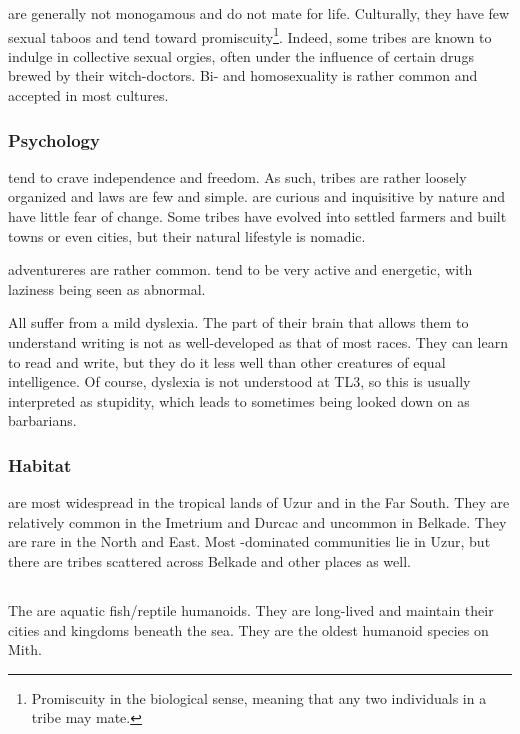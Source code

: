\Meccara{} are generally not monogamous and do not mate for life. Culturally, they have few sexual taboos and tend toward promiscuity\footnote{Promiscuity in the biological sense, meaning that any two individuals in a tribe may mate.}. Indeed, some tribes are known to indulge in collective sexual orgies, often under the influence of certain drugs brewed by their witch-doctors. Bi- and homosexuality is rather common and accepted in most cultures. 

\subsubsection{Psychology}
\Meccara{} tend to crave independence and freedom. As such, \meccaran{} tribes are rather loosely organized and laws are few and simple. \Meccara{} are curious and inquisitive by nature and have little fear of change. Some tribes have evolved into settled farmers and built towns or even cities, but their natural lifestyle is nomadic. 

\Meccaran{} adventureres are rather common. \Meccara{} tend to be very active and energetic, with laziness being seen as abnormal. 

All \meccara{} suffer from a mild dyslexia. The part of their brain that allows them to understand writing is not as well-developed as that of most races. They can learn to read and write, but they do it less well than other creatures of equal intelligence. Of course, dyslexia is not understood at TL3, so this is usually interpreted as stupidity, which leads to \meccarans{} sometimes being looked down on as barbarians. 

\subsubsection{Habitat}
\Meccara{} are most widespread in the tropical lands of Uzur and in the Far South. They are relatively common in the Imetrium and Durcac and uncommon in Belkade. They are rare in the North and East. Most \meccara{}-dominated communities lie in Uzur, but there are \meccaran{} tribes scattered across Belkade and other places as well. 



\subsection{\Naga{}}
\label{Naga}
\label{Nagae}
The \nagae{} are aquatic fish/reptile humanoids. They are long-lived and maintain their cities and kingdoms beneath the sea. They are the oldest humanoid species on Mith. 

